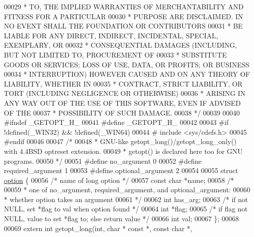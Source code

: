 \begin{DoxyCode}
00029 \textcolor{comment}{ * TO, THE IMPLIED WARRANTIES OF MERCHANTABILITY AND FITNESS FOR A PARTICULAR}
00030 \textcolor{comment}{ * PURPOSE ARE DISCLAIMED.  IN NO EVENT SHALL THE FOUNDATION OR CONTRIBUTORS}
00031 \textcolor{comment}{ * BE LIABLE FOR ANY DIRECT, INDIRECT, INCIDENTAL, SPECIAL, EXEMPLARY, OR}
00032 \textcolor{comment}{ * CONSEQUENTIAL DAMAGES (INCLUDING, BUT NOT LIMITED TO, PROCUREMENT OF}
00033 \textcolor{comment}{ * SUBSTITUTE GOODS OR SERVICES; LOSS OF USE, DATA, OR PROFITS; OR BUSINESS}
00034 \textcolor{comment}{ * INTERRUPTION) HOWEVER CAUSED AND ON ANY THEORY OF LIABILITY, WHETHER IN}
00035 \textcolor{comment}{ * CONTRACT, STRICT LIABILITY, OR TORT (INCLUDING NEGLIGENCE OR OTHERWISE)}
00036 \textcolor{comment}{ * ARISING IN ANY WAY OUT OF THE USE OF THIS SOFTWARE, EVEN IF ADVISED OF THE}
00037 \textcolor{comment}{ * POSSIBILITY OF SUCH DAMAGE.}
00038 \textcolor{comment}{ */}
00039 
00040 \textcolor{preprocessor}{#ifndef \_GETOPT\_H\_}
00041 \textcolor{preprocessor}{#define \_GETOPT\_H\_}
00042 
00043 \textcolor{preprocessor}{#if !defined(\_WIN32) && !defined(\_WIN64)}
00044 \textcolor{preprocessor}{#   include <sys/cdefs.h>}
00045 \textcolor{preprocessor}{#endif}
00046 
00047 \textcolor{comment}{/*}
00048 \textcolor{comment}{ * GNU-like getopt\_long()/getopt\_long\_only() with 4.4BSD optreset extension.}
00049 \textcolor{comment}{ * getopt() is declared here too for GNU programs.}
00050 \textcolor{comment}{ */}
00051 \textcolor{preprocessor}{#define no\_argument        0}
00052 \textcolor{preprocessor}{#define required\_argument  1}
00053 \textcolor{preprocessor}{#define optional\_argument  2}
00054 
00055 \textcolor{keyword}{struct }\hyperlink{structoption}{option} \{
00056     \textcolor{comment}{/* name of long option */}
00057     \textcolor{keyword}{const} \textcolor{keywordtype}{char} *name;
00058     \textcolor{comment}{/*}
00059 \textcolor{comment}{     * one of no\_argument, required\_argument, and optional\_argument:}
00060 \textcolor{comment}{     * whether option takes an argument}
00061 \textcolor{comment}{     */}
00062     \textcolor{keywordtype}{int} has\_arg;
00063     \textcolor{comment}{/* if not NULL, set *flag to val when option found */}
00064     \textcolor{keywordtype}{int} *flag;
00065     \textcolor{comment}{/* if flag not NULL, value to set *flag to; else return value */}
00066     \textcolor{keywordtype}{int} val;
00067 \};
00068 
00069 \textcolor{keyword}{extern} \textcolor{keywordtype}{int}  getopt\_long(\textcolor{keywordtype}{int}, \textcolor{keywordtype}{char} * \textcolor{keyword}{const} *, \textcolor{keyword}{const} \textcolor{keywordtype}{char} *,

\end{DoxyCode}
